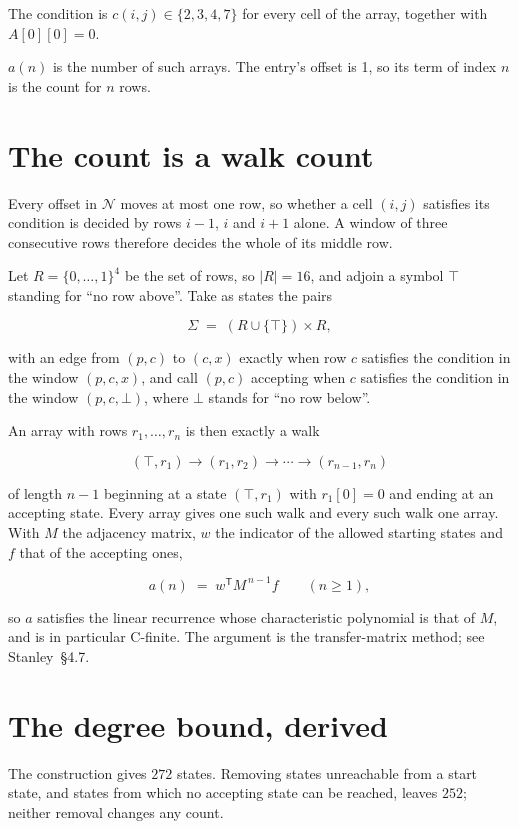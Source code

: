 \documentclass[11pt]{article}
\theoremstyle{definition}
\begin{document}
The condition is $c(i,j) \in \{2, 3, 4, 7\}$ for every cell of the array, together with $A[0][0]=0$.

$a(n)$ is the number of such arrays. The entry's offset is 1, so its term of index $n$ is the count for $n$ rows.

\section{The count is a walk count}

Every offset in $\mathcal{N}$ moves at most one row, so whether a cell $(i,j)$ satisfies its condition is decided by rows $i-1$, $i$ and $i+1$ alone. A window of three consecutive rows therefore decides the whole of its middle row.

Let $R = \{0,\dots,1\}^{4}$ be the set of rows, so $|R| = 16$, and adjoin a symbol $\top$ standing for ``no row above''. Take as states the pairs

\[\Sigma \;=\; (R \cup \{\top\}) \times R,\]

with an edge from $(p,c)$ to $(c,x)$ exactly when row $c$ satisfies the condition in the window $(p,c,x)$, and call $(p,c)$ accepting when $c$ satisfies the condition in the window $(p,c,\bot)$, where $\bot$ stands for ``no row below''.

An array with rows $r_1,\dots,r_n$ is then exactly a walk

\[(\top,r_1) \to (r_1,r_2) \to \cdots \to (r_{n-1},r_n)\]

of length $n-1$ beginning at a state $(\top,r_1)$ with $r_1[0]=0$ and ending at an accepting state. Every array gives one such walk and every such walk one array. With $M$ the adjacency matrix, $w$ the indicator of the allowed starting states and $f$ that of the accepting ones,

\[a(n) \;=\; w^{\mathsf T} M^{\,n-1} f \qquad (n \ge 1),\]

so $a$ satisfies the linear recurrence whose characteristic polynomial is that of $M$, and is in particular C-finite. The argument is the transfer-matrix method; see Stanley~\S4.7.

\section{The degree bound, derived}

The construction gives $272$ states. Removing states unreachable from a start state, and states from which no accepting state can be reached, leaves $252$; neither removal changes any count.
\end{document}
